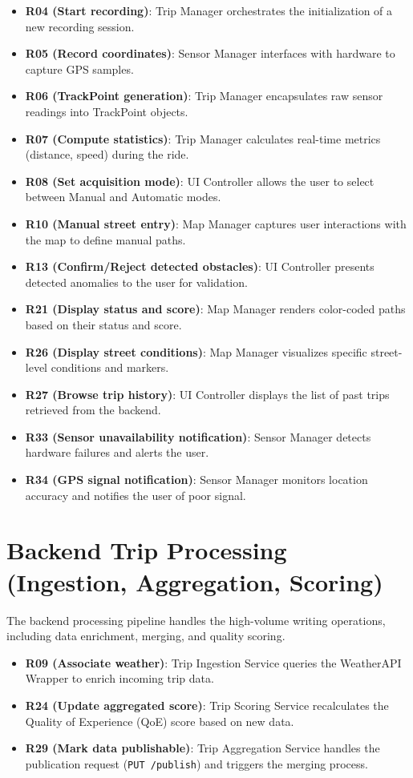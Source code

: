 \begin{itemize}
    \item \textbf{R04 (Start recording)}: Trip Manager orchestrates the initialization of a new recording session.
    \item \textbf{R05 (Record coordinates)}: Sensor Manager interfaces with hardware to capture GPS samples.
    \item \textbf{R06 (TrackPoint generation)}: Trip Manager encapsulates raw sensor readings into TrackPoint objects.
    \item \textbf{R07 (Compute statistics)}: Trip Manager calculates real-time metrics (distance, speed) during the ride.
    \item \textbf{R08 (Set acquisition mode)}: UI Controller allows the user to select between Manual and Automatic modes.
    \item \textbf{R10 (Manual street entry)}: Map Manager captures user interactions with the map to define manual paths.
    \item \textbf{R13 (Confirm/Reject detected obstacles)}: UI Controller presents detected anomalies to the user for validation.
    \item \textbf{R21 (Display status and score)}: Map Manager renders color-coded paths based on their status and score.
    \item \textbf{R26 (Display street conditions)}: Map Manager visualizes specific street-level conditions and markers.
    \item \textbf{R27 (Browse trip history)}: UI Controller displays the list of past trips retrieved from the backend.
    \item \textbf{R33 (Sensor unavailability notification)}: Sensor Manager detects hardware failures and alerts the user.
    \item \textbf{R34 (GPS signal notification)}: Sensor Manager monitors location accuracy and notifies the user of poor signal.
\end{itemize}

\section*{Backend Trip Processing (Ingestion, Aggregation, Scoring)}

The backend processing pipeline handles the high-volume writing operations, including data enrichment, merging, and quality scoring.

\begin{itemize}
    \item \textbf{R09 (Associate weather)}: Trip Ingestion Service queries the WeatherAPI Wrapper to enrich incoming trip data.
    \item \textbf{R24 (Update aggregated score)}: Trip Scoring Service recalculates the Quality of Experience (QoE) score based on new data.
    \item \textbf{R29 (Mark data publishable)}: Trip Aggregation Service handles the publication request (\texttt{PUT /publish}) and triggers the merging process.
\end{itemize}

